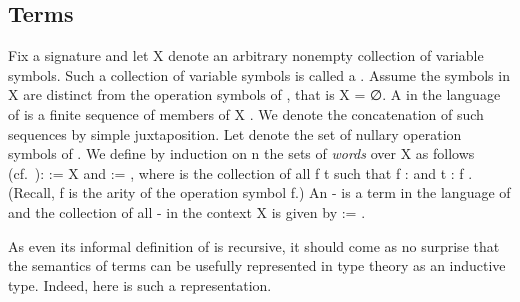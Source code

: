
\subsection{Terms}
\label{terms}
Fix a signature  and let \ab X denote an arbitrary nonempty collection of variable
symbols. Such a collection of variable symbols is called a .
Assume the symbols in \ab X are distinct from the operation symbols of
, that is \ab X     = ∅.
A  in the language of  is a finite sequence of members of \ab X 
. We denote the concatenation of such sequences by simple juxtaposition.
Let  denote the set of nullary operation symbols of . We define by induction
on \ab n the sets  of \emph{words} over \ab X   as
follows (cf.~\cite[Def. 4.19]{Bergman:2012}):  := \ab X   and
 :=   , where  is the collection of all \ab f \ab t
such that \ab f :  and \ab t :  \ab f 
.
\ifshort\else
(Recall,  \ab f is the arity of the operation symbol \ab f.)
\fi
An - is a term in the language of  and the collection of all
- in the context \ab X is given by  :=  .

As even its informal definition of  is recursive, it should come as no surprise
that the semantics of terms can be usefully represented in type theory as an inductive
type. Indeed, here is such a representation.

